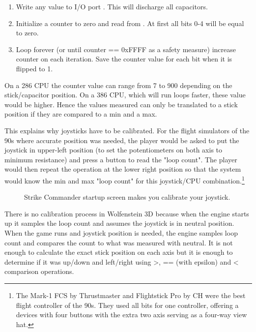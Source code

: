 \begin{enumerate}
 \item Write  any value to I/O port . This will discharge all capacitors.
 \item Initialize a counter to zero and read  from . At first all bits 0-4 will be equal to zero.
 \item Loop forever (or until counter == 0xFFFF as a safety measure) increase counter on each iteration. Save the counter value for each bit when it is flipped to 1.
\end{enumerate}
\par
On a 286 CPU the counter value can range from 7 to 900 depending on the stick/capacitor position. On a 386 CPU, which will run loops faster, these value would be higher. Hence the values measured can only be translated to a stick position if they are compared to a min and a max.\\
\par 
This explains why joysticks have to be calibrated. For the flight simulators of the 90s where accurate position was needed, the player would be asked to put the joystick in upper-left position (to set the potentiometers on both axis to minimum resistance) and press a button to read the "loop count". The player would then repeat the operation at the lower right position so that the system  would know the min and max "loop count" for this joystick/CPU combination.\footnote{The Mark-1 FCS by Thrustmaster and Flightstick Pro by CH were the best flight controller of the 90s. They used all bits for one controller, offering a devices with four buttons with the extra two axis serving as a four-way view hat.}\\
\par
\begin{figure}[H]
\centering
{}
\caption{Strike Commander startup screen makes you calibrate your joystick.}
\end{figure}
\par
There is no calibration process in Wolfenstein 3D because when the engine starts up it samples the loop count and assumes the joystick is in neutral position. When the game runs and joystick position is needed, the engine samples loop count and compares the count to what was measured with neutral. It is not enough to calculate the exact stick position on each axis but it is enough to determine if it was up/down and left/right using >, == (with epsilon) and < comparison operations.
